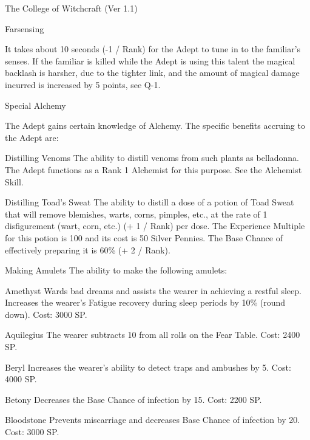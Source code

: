 \begin{Chapter}{The College of Witchcraft (Ver 1.1)}
\begin{talent}[T-1]{Farsensing}
\begin{effects}
It takes about 10 seconds (-1 / Rank) for the Adept to tune in to the
familiar’s senses. If the familiar is killed while the Adept is using
this talent the magical backlash is harsher, due to the tighter link,
and the amount of magical damage incurred is increased by 5 points,
see Q-1.
\end{effects}
\end{talent}

\begin{talent}[T-2]{Special Alchemy}
\begin{effects}
The Adept gains certain knowledge of Alchemy.  The specific benefits
accruing to the Adept are:

\begin{Description}
\item[Distilling Venoms] The ability to distill venoms from such
  plants as belladonna.  The Adept functions as a Rank 1 Alchemist
  for this purpose.  See the Alchemist Skill.

\item[Distilling Toad’s Sweat] The ability to distill a dose of a
  potion of Toad Sweat that will remove blemishes, warts, corns,
  pimples, etc., at the rate of 1 disfigurement (wart, corn, etc.)  (+
  1 / Rank) per dose.  The Experience Multiple for this potion is 100
  and its cost is 50 Silver Pennies.  The Base Chance of effectively
  preparing it is 60\% (+ 2 / Rank).

\item[Making  Amulets]  The  ability  to  make  the  following amulets: 
\begin{Description}
\item[Amethyst] Wards bad dreams and assists the wearer in achieving a
  restful sleep.  Increases the wearer’s Fatigue recovery during sleep
  periods by 10\% (round down). Cost: 3000 SP.

\item[Aquilegius] The wearer subtracts 10 from all rolls on the Fear
  Table. Cost: 2400 SP.

\item[Beryl] Increases the wearer’s ability to detect traps and
  ambushes by 5. Cost: 4000 SP.

\item[Betony] Decreases the Base Chance of infection by 15. Cost: 2200
  SP.

\item[Bloodstone] Prevents miscarriage and decreases Base Chance of
  infection by 20. Cost: 3000 SP.


\end{Description}
\end{Description}
\end{effects}
\end{talent}
\end{Chapter}
